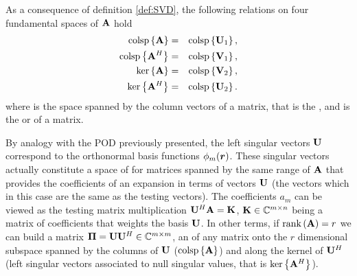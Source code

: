 \par As a consequence of definition \ref{def:SVD}, the following relations on four fundamental spaces of $\mathbf{A}$ hold
\begin{eqnarray}
\label{eq:SVDspacesProperties}
\mathrm{colsp} \left \{ \mathbf{A} \right \} &= & \mathrm{colsp} \left \{ \mathbf{U}_1 \right \}, \nonumber \\
\mathrm{colsp} \left \{ \mathbf{A}^H \right \} &= & \mathrm{colsp} \left \{ \mathbf{V}_1 \right \}, \nonumber\\
\mathrm{ker} \left \{ \mathbf{A} \right \} &= & \mathrm{colsp} \left \{ \mathbf{V}_2 \right \}, \nonumber \\
\mathrm{ker} \left \{ \mathbf{A}^H \right \} &= & \mathrm{colsp} \left \{ \mathbf{U}_2 \right \}.
\end{eqnarray} where  is the space spanned by the column vectors of a matrix, that is the , and  is the  or  of a matrix. \cite{TrefethenBauNLA}

\par By analogy with the POD previously presented, the left singular vectors $\mathbf{U}$ correspond to the orthonormal basis functions $\phi_m(\mbfit{r})$. These singular vectors actually constitute a space of  for matrices spanned by the same range of $\mathbf{A}$ that provides the coefficients of an expansion in terms of vectors $\mathbf{U}$ (the  vectors which in this case are the same as the testing vectors). The coefficients $a_m$ can be viewed as the testing matrix multiplication $\mathbf{U}^H \mathbf{A} = \mathbf{K}$, $\mathbf{K} \in \mathbb{C}^{m \times n}$ being a matrix of coefficients that weights the basis $\mathbf{U}$. In other terms, if $\mathrm{rank} \left ( \mathbf{A} \right ) = r$ we can build a matrix $\mathbf{\Pi} = \mathbf{U} \mathbf{U}^H \in \mathbb{C}^{m \times m}$, an  \cite{SaadIMSLS} of any matrix onto the $r$ dimensional subspace spanned by the columns of $\mathbf{U}$ ($\mathrm{colsp} \left \{ \mathbf{A} \right \}$) and along the kernel of $\mathbf{U}^H$ (left singular vectors associated to null singular values, that is $\mathrm{ker} \left \{ \mathbf{A}^H \right \}$).

